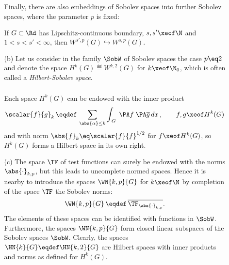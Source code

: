 \documentclass[11pt,twoside]{article}
\def\G{G}
\begin{document}
\begin{itemize}[leftmargin=12pt,itemsep=5pt]
\begin{itemize}[leftmargin=17pt]
\subparagraph{} %
Finally,
there are also embeddings of Sobolev spaces into further Sobolev spaces,
where the parameter $p$ is fixed:

\begin{theorem1}\label{I_SOBOLEV_EMBEDDING_THEOREM_3}
If $\G \subset \Rd$ has Lipschitz-continuous boundary,
$s,s' \xeof \N$ and $1 < s < s' < \infty$,
then $W^{s',p}(\G) \hookrightarrow W^{s,p}(\G)$.
\end{theorem1}

\item[(b)] Let us consider in the family $\SobW$ of Sobolev spaces
the case $p \eq 2$ and denote the space $H^k(\G) \eqdef W^{k,2}(\G)$
for $k \xeof \N_0$,
which is often called a \textit{Hilbert-Sobolev space}.

\subparagraph{} %
Each space $H^k(\G)$ can be endowed with the inner product
\[
\scalar{f}{g}_k \, \eqdef \,
\sum_{\abs{\alpha} \leq k} \int_{\,\G} \;
\PA f \; \PA \overline{g} \, dx\,,
\quad \quad f,g \xeof H^k(\G)
\]
and with norm
$\abs{f} _k \eq \scalar{f}{f}^{1/2}$ for $f \xeof H^k(\G)$,
so $H^k(\G)$ forms a Hilbert space in its own right.

\item[(c)] The space $\TF$ of test functions can surely be endowed
with the norms $\abs{\cdot} _{k,p}$,
but this leads to uncomplete normed spaces.
Hence it is nearby to introduce the spaces $\WN{k,p}{\G}$ for $k \xeof \N$
by completion of the space $\TF$ {\wrt} the Sobolev norms:
\[
\WN{k,p}{\G} \, \eqdef \, \overline{\TF_{\abs{\cdot} _{k,p}}}.
\]
The elements of these spaces can be identified with functions in $\SobW$.
Furthermore,
the spaces $\WN{k,p}{\G}$ form closed linear subspaces
of the Sobolev spaces $\SobW$.
Clearly,
the spaces $\HN{k}{\G} \eqdef \HN{k,2}{\G}$ are Hilbert spaces
with inner products and norms as defined for $H^k(\G)$.
\end{itemize}
\end{itemize}

\end{document}
